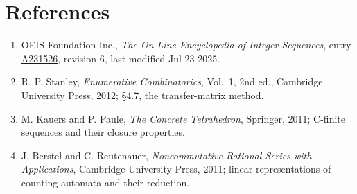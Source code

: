 \documentclass[11pt]{article}
\theoremstyle{definition}
\begin{document}
\section{References}

\begin{enumerate}

\item OEIS Foundation Inc., \emph{The On-Line Encyclopedia of Integer Sequences}, entry \href{https://oeis.org/A231526}{A231526}, revision 6, last modified Jul 23 2025.

\item R. P. Stanley, \emph{Enumerative Combinatorics}, Vol.~1, 2nd ed., Cambridge University Press, 2012; \S4.7, the transfer-matrix method.

\item M. Kauers and P. Paule, \emph{The Concrete Tetrahedron}, Springer, 2011; C-finite sequences and their closure properties.

\item J. Berstel and C. Reutenauer, \emph{Noncommutative Rational Series with Applications}, Cambridge University Press, 2011; linear representations of counting automata and their reduction.

\end{enumerate}
\end{document}
